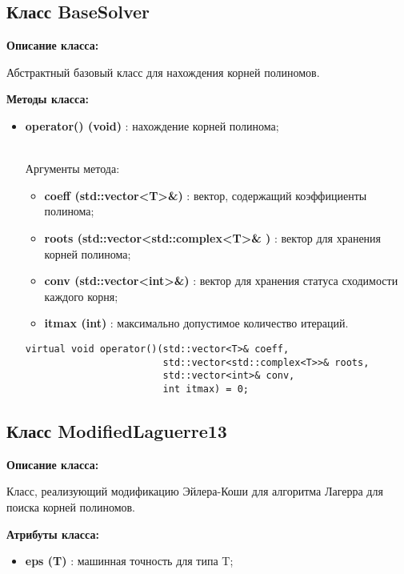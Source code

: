 \documentclass[a4paper,12pt]{article}
\begin{document}
\subsection{Класс BaseSolver}
\textbf{Описание класса:}

Абстрактный базовый класс для нахождения корней полиномов. 

\textbf{Методы класса:}
\begin{itemize}
    \item \textbf{operator() (void)} : нахождение корней полинома;

\\Аргументы метода:
    \begin{itemize}
        \renewcommand{\labelitemi}{-}
        \item \textbf{coeff (std::vector<T>\&)} : вектор, содержащий коэффициенты полинома;
        \item \textbf{roots (std::vector<std::complex<T>\& )} : вектор для хранения корней полинома;
        \item \textbf{conv (std::vector<int>\&)} : вектор для хранения статуса сходимости каждого корня;
        \item \textbf{itmax (int)} : максимально допустимое количество итераций.
    \end{itemize}
\begin{lstlisting}[language=С++]
virtual void operator()(std::vector<T>& coeff, 
                        std::vector<std::complex<T>>& roots, 
                        std::vector<int>& conv, 
                        int itmax) = 0; \end{lstlisting}
\end{itemize}
    
\subsection{Класс ModifiedLaguerre13}
\textbf{Описание класса:}

Класс, реализующий модификацию Эйлера-Коши для алгоритма Лагерра для поиска корней полиномов.

\textbf{Атрибуты класса:}
\begin{itemize}
\renewcommand{\labelitemi}{-}
    \item \textbf{eps (T)} : машинная точность для типа T;
\end{itemize}
\end{document}

